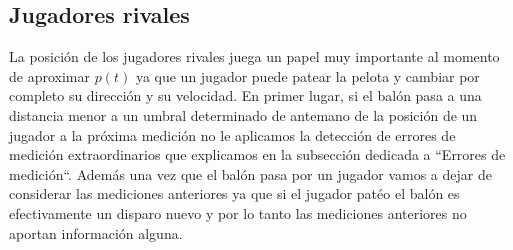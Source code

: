 \subsection{Jugadores rivales}
La posición de los jugadores rivales juega un papel muy importante al momento de aproximar $p(t)$ ya que un jugador puede 
patear la pelota y cambiar por completo su dirección y su velocidad. En primer lugar, si el balón pasa a una distancia menor a un umbral
determinado de antemano de la posición de un jugador a la próxima medición no le aplicamos la detección de errores de medición
extraordinarios que explicamos en la subsección dedicada a ``Errores de medición``. Además una vez que el balón pasa por un jugador vamos a 
dejar de considerar las mediciones anteriores ya que si el jugador patéo el balón es efectivamente un disparo nuevo y por lo tanto las
mediciones anteriores no aportan información alguna.

















